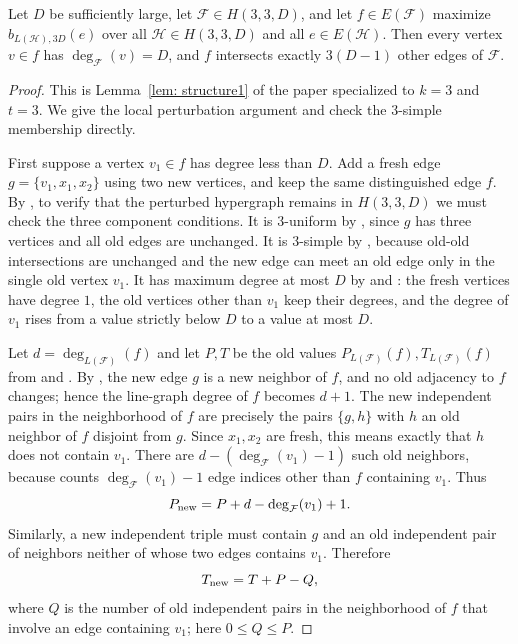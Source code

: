 \begin{lemma}
Let $D$ be sufficiently large, let $\mathcal F\in H(3,3,D)$, and let
$f\in E(\mathcal F)$ maximize $b_{L(\mathcal H),3D}(e)$ over all
$\mathcal H\in H(3,3,D)$ and all $e\in E(\mathcal H)$.  Then every vertex
$v\in f$ has $\deg_{\mathcal F}(v)=D$, and $f$ intersects exactly
$3(D-1)$ other edges of $\mathcal F$.
\end{lemma}
\begin{proof}
This is Lemma~\ref{lem: structure1} of the paper specialized to $k=3$ and
$t=3$.  We give the local perturbation argument and check the $3$-simple
membership directly.

First suppose a vertex $v_1\in f$ has degree less than $D$.  Add a fresh edge
$g=\{v_1,x_1,x_2\}$ using two new vertices, and keep the same distinguished
edge $f$.  By , to verify that the perturbed
hypergraph remains in $H(3,3,D)$ we must check the three component
conditions.  It is $3$-uniform by , since $g$ has
three vertices and all old edges are unchanged.  It is $3$-simple by
, because old-old intersections are unchanged and
the new edge can meet an old edge only in the single old vertex $v_1$.  It has
maximum degree at most $D$ by  and
: the fresh vertices have degree $1$, the old
vertices other than $v_1$ keep their degrees, and the degree of $v_1$ rises
from a value strictly below $D$ to a value at most $D$.

Let $d=\deg_{L(\mathcal F)}(f)$ and let $P,T$ be the old values
$P_{L(\mathcal F)}(f),T_{L(\mathcal F)}(f)$ from
 and .  By
, the new edge $g$ is a new neighbor of $f$,
and no old adjacency to $f$ changes; hence the line-graph degree of $f$
becomes $d+1$.  The new independent pairs in the neighborhood of $f$ are
precisely the pairs $\{g,h\}$ with $h$ an old neighbor of $f$ disjoint from
$g$.  Since $x_1,x_2$ are fresh, this means exactly that $h$ does not contain
$v_1$.  There are $d-(\deg_{\mathcal F}(v_1)-1)$ such old neighbors, because
 counts $\deg_{\mathcal F}(v_1)-1$ edge indices
other than $f$ containing $v_1$.  Thus
\[
P_{\rm new}=P+d-\deg_{\mathcal F}(v_1)+1 .
\]
Similarly, a new independent triple must contain $g$ and an old independent
pair of neighbors neither of whose two edges contains $v_1$.  Therefore
\[
T_{\rm new}=T+P-Q,
\]
where $Q$ is the number of old independent pairs in the neighborhood of $f$
that involve an edge containing $v_1$; here $0\le Q\le P$.


\end{proof}
